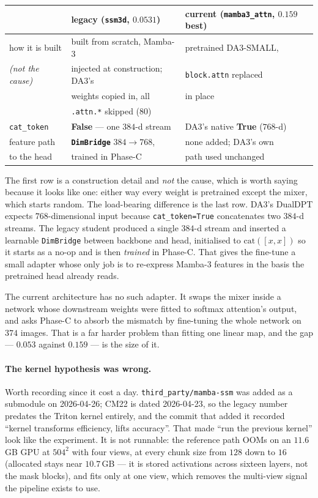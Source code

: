 \documentclass[11pt,a4paper]{article}
\begin{document}
\begin{center}\small
\begin{tabular}{lll}
\toprule
 & legacy (\texttt{ssm3d}, $0.0531$) & current (\texttt{mamba3\_attn}, $0.159$ best) \\
\midrule
how it is built & built from scratch, Mamba-3 & pretrained DA3-SMALL, \\
\emph{(not the cause)} & injected at construction; DA3's & \texttt{block.attn} replaced \\
           & weights copied in, all         & in place \\
           & \texttt{.attn.*} skipped ($80$) & \\
\midrule
\texttt{cat\_token} & \textbf{False} --- one $384$-d stream & DA3's native \textbf{True} ($768$-d) \\
feature path & \textbf{\texttt{DimBridge}} $384\!\to\!768$, & none added; DA3's own \\
 to the head & trained in Phase-C            & path used unchanged \\
\bottomrule
\end{tabular}
\end{center}

\noindent The first row is a construction detail and \emph{not} the cause, which is worth
saying because it looks like one: either way every weight is pretrained except the mixer,
which starts random. The load-bearing difference is the last row. DA3's DualDPT expects
$768$-dimensional input because \texttt{cat\_token=True} concatenates two
$384$-d streams. The legacy student produced a single $384$-d stream and
inserted a learnable \texttt{DimBridge} between backbone and head, initialised
to $\mathrm{cat}([x,x])$ so it starts as a no-op and is then \emph{trained} in
Phase-C. That gives the fine-tune a small adapter whose only job is to
re-express Mamba-3 features in the basis the pretrained head already reads.

The current architecture has no such adapter. It swaps the mixer inside a
network whose downstream weights were fitted to softmax attention's output,
and asks Phase-C to absorb the mismatch by fine-tuning the whole network on
$374$ images. That is a far harder problem than fitting one linear map, and
the gap --- $0.053$ against $0.159$ --- is the size of it.

\paragraph{The kernel hypothesis was wrong.} Worth recording since it cost a
day. \texttt{third\_party/mamba-ssm} was added as a submodule on 2026-04-26;
CM22 is dated 2026-04-23, so the legacy number predates the Triton kernel
entirely, and the commit that added it recorded ``kernel transforms
efficiency, lifts accuracy''. That made ``run the previous kernel'' look like
the experiment. It is not runnable: the reference path OOMs on an $11.6$\,GB
GPU at $504^2$ with four views, at every chunk size from $128$ down to $16$
(allocated stays near $10.7$\,GB --- it is stored activations across sixteen
layers, not the mask blocks), and fits only at one view, which removes the
multi-view signal the pipeline exists to use.
\end{document}
